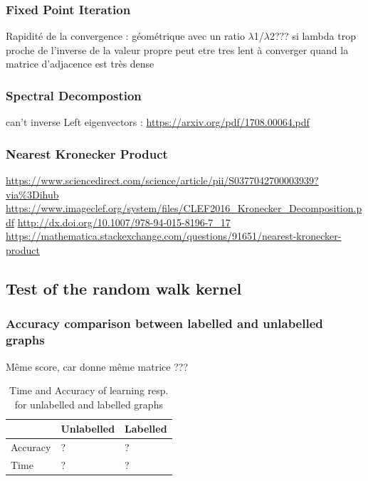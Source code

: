\documentclass{article}
\theoremstyle{definition}
\begin{document}
\subsubsection{Fixed Point Iteration}
  Rapidité de la convergence : géométrique avec un ratio $\lambda$1/$\lambda$2???
si lambda trop proche de l'inverse de la valeur propre peut etre tres lent à converger quand la matrice d'adjacence est très dense\\
\subsubsection{Spectral Decompostion}
can't inverse Left eigenvectors : 
\url{https://arxiv.org/pdf/1708.00064.pdf}
\subsubsection{Nearest Kronecker Product}
\url{https://www.sciencedirect.com/science/article/pii/S0377042700003939?via%3Dihub}
	\url{https://www.imageclef.org/system/files/CLEF2016_Kronecker_Decomposition.pdf}
	\url{http://dx.doi.org/10.1007/978-94-015-8196-7_17}
	\url{https://mathematica.stackexchange.com/questions/91651/nearest-kronecker-product}
	

\subsection{Test of the random walk kernel}
\subsubsection{Accuracy comparison between labelled and unlabelled graphs}
Même score, car donne même matrice ???
\begin{table}[!htb]
\begin{center}
\begin{tabular}{|l|l|l|}
    \hline
    & Unlabelled & Labelled \\
    \hline
    Accuracy & ? & ? \\
    \hline
    Time & ? & ? \\
    \hline
\end{tabular}
\end{center}
\caption {Time and Accuracy of learning resp. for unlabelled and labelled graphs} \label{tab:lab_vs_nolab} 
\end{table}
\end{document}
